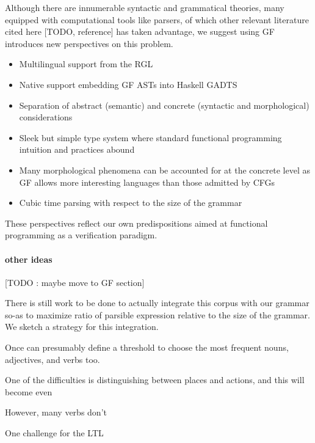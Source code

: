\documentclass[a4paper, 11pt]{article}
\begin{document}
Although there are innumerable syntactic and grammatical theories, many
equipped with computational tools like parsers, of which other relevant
literature cited here [TODO, reference] has taken advantage, we suggest using GF
introduces new perspectives on this problem. 

\begin{itemize}
\item Multilingual support from the RGL
\item Native support embedding GF ASTs into Haskell GADTS
\item Separation of abstract (semantic) and concrete (syntactic and
  morphological) considerations
\item Sleek but simple type system where standard functional programming
  intuition and practices abound
\item Many morphological phenomena can be accounted for at the concrete level as
  GF allows more interesting languages than those admitted by CFGs 
\item Cubic time parsing with respect to the size of the grammar
\end{itemize}

These perspectives reflect our own predispositions aimed at functional
programming as a verification paradigm.
  

\paragraph{other ideas}
[TODO : maybe move to GF section]

There is still work to be done to actually integrate this corpus with our
grammar so-as to maximize ratio of parsible expression relative to the size of the
grammar. We sketch a strategy for this integration.

Once can presumably define a
threshold to choose the most frequent nouns, adjectives, and verbs too.

One of the difficulties is distinguishing between places and actions, and this
will become even 

However,
many verbs don't 

One challenge for the LTL 
\end{document}
